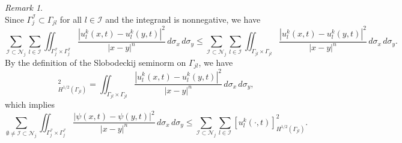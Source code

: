 \documentclass[a4paper, 11pt]{article}
\theoremstyle{remark}
\newtheorem{remark}[equation]{Remark}
\begin{document}
\begin{remark}
\begin{equation*}
    \end{equation*}
    Since $\Gamma_{j}^{\mathcal{I}}\subset\Gamma_{jl}$ for all $l\in \mathcal{I}$ and the integrand is nonnegative, we have
    \begin{equation*}
        \sum_{\mathcal{I}\subset\mathcal{N}_{j}} \sum_{l\in\mathcal{I}}\iint_{\Gamma_j^{\mathcal{I}} \times \Gamma_j^{\mathcal{I}}} \frac{|u_{l}^{k}(x, t) - u_{l}^{k}(y, t)|^2}{|x-y|^n} \, d\sigma_x \, d\sigma_y \leq \sum_{\mathcal{I}\subset\mathcal{N}_{j}} \sum_{l\in\mathcal{I}}\iint_{\Gamma_{jl} \times \Gamma_{jl}} \frac{|u_{l}^{k}(x, t) - u_{l}^{k}(y, t)|^2}{|x-y|^n} \, d\sigma_x \, d\sigma_y.
    \end{equation*}
    By the definition of the Slobodeckij seminorm on $\Gamma_{jl}$, we have
    \begin{equation*}
        [u_{l}^{k}]^{2}_{H^{1/2}(\Gamma_{jl})} = \iint_{\Gamma_{jl} \times \Gamma_{jl}} \frac{|u_{l}^{k}(x, t) - u_{l}^{k}(y, t)|^2}{|x-y|^n} \, d\sigma_x \, d\sigma_y,
    \end{equation*}
    which implies
    \begin{equation*}
        \sum_{\emptyset\neq\mathcal{I}\subset\mathcal{N}_{j}} \iint_{\Gamma_j^{\mathcal{I}} \times \Gamma_j^{\mathcal{I}}} \frac{|\psi(x, t)-\psi(y, t)|^2}{|x-y|^n} \, d\sigma_x \, d\sigma_y \leq \sum_{\mathcal{I}\subset\mathcal{N}_{j}} \sum_{l\in\mathcal{I}}[u_{l}^{k}(\cdot, t)]^{2}_{H^{1/2}(\Gamma_{jl})}.
    \end{equation*}



\end{remark}
\end{document}
